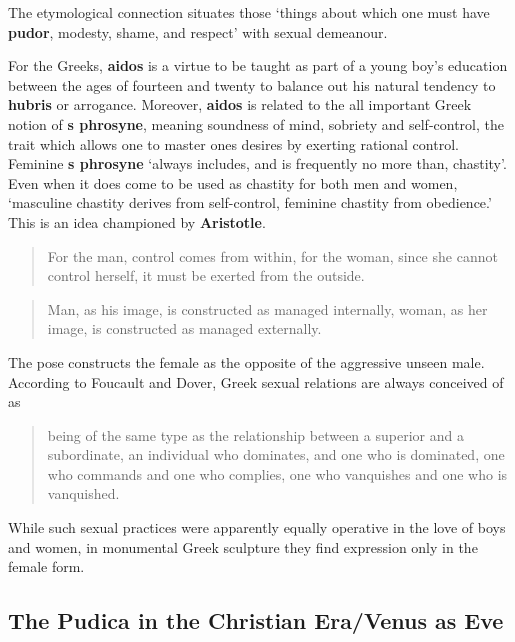 \begin{nte}
    The etymological connection situates those `things about which one must have \textbf{pudor}, modesty, shame, and respect' with sexual demeanour. 
\end{nte}

For the Greeks, \textbf{aidos} is a virtue to be taught as part of a young boy's education between the ages of fourteen and twenty to balance out his natural tendency to \textbf{hubris} or arrogance. Moreover, \textbf{aidos} is related to the all important Greek notion of \textbf{s phrosyne}, meaning soundness of mind, sobriety and self-control, the trait which allows one to master ones desires by exerting rational control. Feminine \textbf{s phrosyne} `always includes, and is frequently no more than, chastity'. Even when it does come to be used as chastity for both men and women, `masculine chastity derives from self-control, feminine chastity from obedience.' This is an idea championed by \textbf{Aristotle}. 

\begin{quotation}
    For the man, control comes from within, for the woman, since she cannot control herself, it must be exerted from the outside.
\end{quotation}


\begin{quotation}
    Man, as his image, is constructed as managed internally, woman, as her image, is constructed as managed externally.
\end{quotation}

The pose constructs the female as the opposite of the aggressive unseen male. According to Foucault and Dover, Greek sexual relations are always conceived of as 

\begin{quotation}
    being of the same type as the relationship between a superior and a subordinate, an individual who dominates, and one who is dominated, one who commands and one who complies, one who vanquishes and one who is vanquished.
\end{quotation}

While such sexual practices were apparently equally operative in the love of boys and women, in monumental Greek sculpture they find expression only in the female form.

\subsection{The Pudica in the Christian Era/Venus as Eve}



